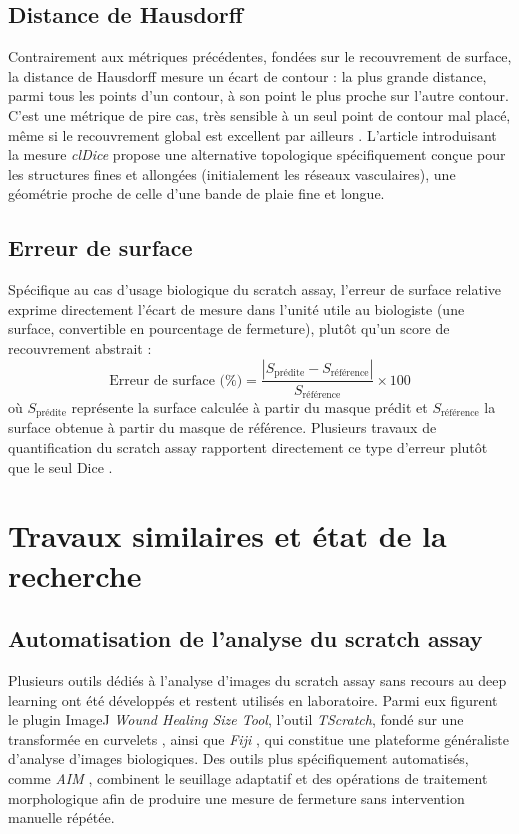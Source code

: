 \documentclass[12pt,a4paper]{report}
\begin{document}
\subsection{Distance de Hausdorff}

Contrairement aux métriques précédentes, fondées sur le recouvrement de surface, la distance de Hausdorff mesure un écart de contour : la plus grande distance, parmi tous les points d'un contour, à son point le plus proche sur l'autre contour. C'est une métrique de pire cas, très sensible à un seul point de contour mal placé, même si le recouvrement global est excellent par ailleurs \cite{ref7}. L'article introduisant la mesure \textit{clDice} \cite{ref8} propose une alternative topologique spécifiquement conçue pour les structures fines et allongées (initialement les réseaux vasculaires), une géométrie proche de celle d'une bande de plaie fine et longue.

\subsection{Erreur de surface}

Spécifique au cas d'usage biologique du scratch assay, l'erreur de surface relative exprime directement l'écart de mesure dans l'unité utile au biologiste (une surface, convertible en pourcentage de fermeture), plutôt qu'un score de recouvrement abstrait :
\[
\text{Erreur de surface (\%)} = \frac{|S_{\text{prédite}} - S_{\text{référence}}|}{S_{\text{référence}}} \times 100
\]
où $S_{\text{prédite}}$ représente la surface calculée à partir du masque prédit et $S_{\text{référence}}$ la surface obtenue à partir du masque de référence. Plusieurs travaux de quantification du scratch assay rapportent directement ce type d'erreur plutôt que le seul Dice \cite{ref9,ref10}.

\section{Travaux similaires et état de la recherche}
\label{sec:travaux}

\subsection{Automatisation de l'analyse du scratch assay}

Plusieurs outils dédiés à l'analyse d'images du scratch assay sans recours au deep learning ont été développés et restent utilisés en laboratoire. Parmi eux figurent le plugin ImageJ \textit{Wound Healing Size Tool}, l'outil \textit{TScratch}, fondé sur une transformée en curvelets \cite{ref15}, ainsi que \textit{Fiji} \cite{ref16}, qui constitue une plateforme généraliste d'analyse d'images biologiques. Des outils plus spécifiquement automatisés, comme \textit{AIM} \cite{ref17}, combinent le seuillage adaptatif et des opérations de traitement morphologique afin de produire une mesure de fermeture sans intervention manuelle répétée.
\end{document}

